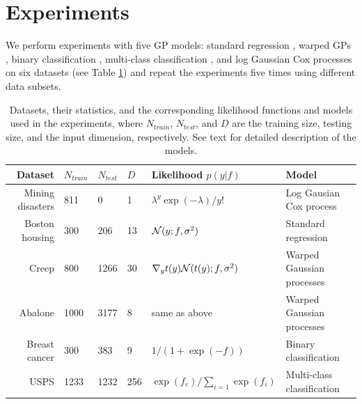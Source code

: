 \section{Experiments \label{sec:expts}}   
We perform experiments with five  GP models: standard regression \cite{rasmussen-williams-book}, warped GPs \cite{snelson2003warped}, binary classification \cite{nickisch2008approximations,williams1998bayesian}, multi-class classification \cite{williams1998bayesian}, and log Gaussian Cox processes \cite{moller1998log} on six  datasets (see Table \ref{tab:datasets})
and repeat the experiments five times using different data subsets. 
%
\setlength{\tabcolsep}{4pt}
\begin{table}[t]
\begin{center}
\caption{Datasets, their statistics, and the corresponding likelihood functions and models used in the experiments,
where $N_{train}$, $N_{test}$, and $D$ are the training size, testing size, and the input dimension, respectively. See text for detailed description of the models.}
\label{tab:datasets}
\begin{tabular}{rlllll}
\toprule
Dataset & \textbf{$N_{train}$} & \textbf{$N_{test}$} & \textbf{$D$} & Likelihood $p(y|f)$ & Model   \\ \hline
Mining disasters & 811 & 0 & 1 & $\lambda^y \exp(-\lambda)/y!$ & Log Gausian Cox process \\
Boston housing & 300 & 206 & 13 &$\mathcal{N}(y; f, \sigma^2) $ & Standard regression \\
Creep & 800 & 1266 & 30 & $\nabla_y t(y) \mathcal{N}(t(y); f, \sigma^2) $ & Warped Gaussian processes \\
Abalone & 1000 & 3177 & 8 & same as above & Warped Gaussian processes \\
Breast cancer & 300 & 383 & 9 &$1/(1+\exp(-f))$ & Binary classification \\
USPS & 1233 & 1232 & 256& $\exp(f_c) / \sum_{i=1} \exp(f_i)$ & Multi-class classification \\
\bottomrule
\end{tabular}
\end{center}
\end{table}

